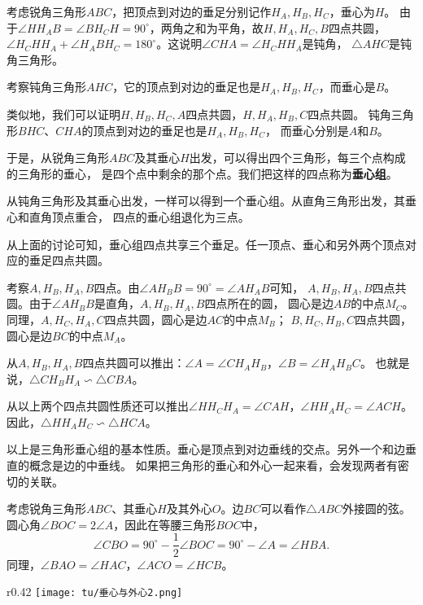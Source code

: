 \documentclass[12pt,UTF8]{ctexbook}
\begin{document}
考虑锐角三角形$ABC$，把顶点到对边的垂足分别记作$H_A, H_B, H_C$，垂心为$H$。
由于$\angle HH_AB = \angle BH_CH = 90^\circ$，两角之和为平角，故$H, H_A, H_C, B$四点共圆，
$\angle H_CHH_A + \angle H_ABH_C = 180^\circ$。这说明$\angle CHA = \angle H_CHH_A$是钝角，
$\triangle AHC$是钝角三角形。

考察钝角三角形$AHC$，它的顶点到对边的垂足也是$H_A, H_B, H_C$，而垂心是$B$。

类似地，我们可以证明$H, H_B, H_C, A$四点共圆，$H, H_A, H_B, C$四点共圆。
钝角三角形$BHC$、$CHA$的顶点到对边的垂足也是$H_A, H_B, H_C$，
而垂心分别是$A$和$B$。

于是，从锐角三角形$ABC$及其垂心$H$出发，可以得出四个三角形，每三个点构成的三角形的垂心，
是四个点中剩余的那个点。我们把这样的四点称为\textbf{垂心组}。

从钝角三角形及其垂心出发，一样可以得到一个垂心组。从直角三角形出发，其垂心和直角顶点重合，
四点的垂心组退化为三点。

从上面的讨论可知，垂心组四点共享三个垂足。任一顶点、垂心和另外两个顶点对应的垂足四点共圆。

考察$A, H_B, H_A, B$四点。由$\angle AH_BB = 90^\circ = \angle AH_AB$可知，
$A, H_B, H_A, B$四点共圆。由于$\angle AH_BB$是直角，$A, H_B, H_A, B$四点所在的圆，
圆心是边$AB$的中点$M_C$。同理，$A, H_C, H_A, C$四点共圆，圆心是边$AC$的中点$M_B$；
$B, H_C, H_B, C$四点共圆，圆心是边$BC$的中点$M_A$。

从$A, H_B, H_A, B$四点共圆可以推出：$\angle A = \angle CH_AH_B$，$\angle B = \angle H_AH_BC$。
也就是说，$\triangle CH_BH_A \backsim \triangle CBA$。

从以上两个四点共圆性质还可以推出$\angle HH_CH_A = \angle CAH$，$\angle HH_AH_C = \angle ACH$。
因此，$\triangle HH_AH_C \backsim \triangle HCA$。

以上是三角形垂心组的基本性质。垂心是顶点到对边垂线的交点。另外一个和边垂直的概念是边的中垂线。
如果把三角形的垂心和外心一起来看，会发现两者有密切的关联。

考虑锐角三角形$ABC$、其垂心$H$及其外心$O$。边$BC$可以看作$\triangle ABC$外接圆的弦。
圆心角$\angle BOC = 2\angle A$，因此在等腰三角形$BOC$中，
$$\angle CBO = 90^\circ - \frac{1}{2}\angle BOC = 90^\circ - \angle A = \angle HBA.$$
同理，$\angle BAO = \angle HAC$，$\angle ACO = \angle HCB$。

\begin{wrapfigure}[9]{r}{0.42\textwidth} %
    \vspace{-50pt}
    \flushright
    \texttt{[image: tu/垂心与外心2.png]}
\end{wrapfigure}
\end{document}
